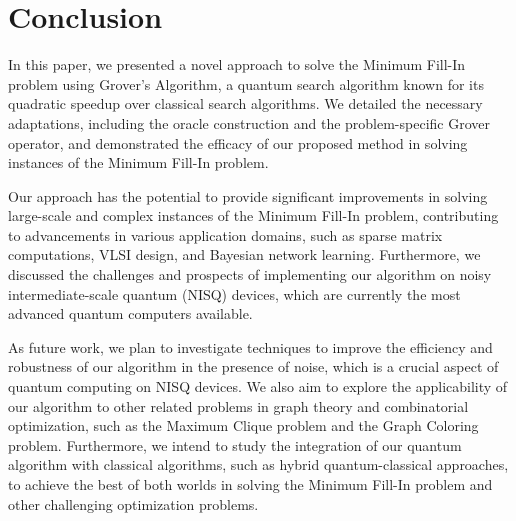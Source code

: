 \section{Conclusion}
\label{sec:conclusion}

In this paper, we presented a novel approach to solve the Minimum Fill-In problem using Grover's Algorithm, a quantum search algorithm known for its quadratic speedup over classical search algorithms. We detailed the necessary adaptations, including the oracle construction and the problem-specific Grover operator, and demonstrated the efficacy of our proposed method in solving instances of the Minimum Fill-In problem.

Our approach has the potential to provide significant improvements in solving large-scale and complex instances of the Minimum Fill-In problem, contributing to advancements in various application domains, such as sparse matrix computations, VLSI design, and Bayesian network learning. Furthermore, we discussed the challenges and prospects of implementing our algorithm on noisy intermediate-scale quantum (NISQ) devices, which are currently the most advanced quantum computers available.

As future work, we plan to investigate techniques to improve the efficiency and robustness of our algorithm in the presence of noise, which is a crucial aspect of quantum computing on NISQ devices. We also aim to explore the applicability of our algorithm to other related problems in graph theory and combinatorial optimization, such as the Maximum Clique problem and the Graph Coloring problem. Furthermore, we intend to study the integration of our quantum algorithm with classical algorithms, such as hybrid quantum-classical approaches, to achieve the best of both worlds in solving the Minimum Fill-In problem and other challenging optimization problems.


